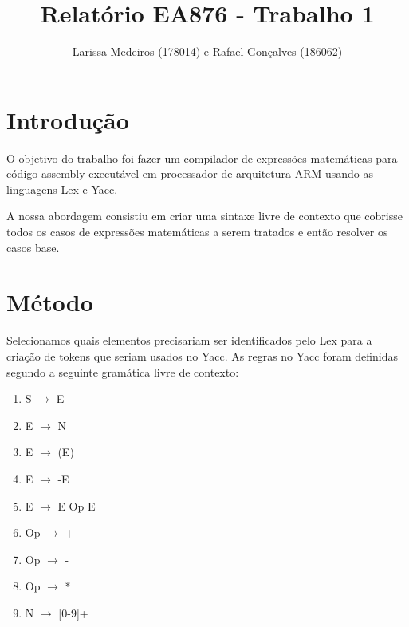 \documentclass[a4paper, 10pt]{article}
\title{Relatório EA876 - Trabalho 1}
\author{Larissa Medeiros (178014) e Rafael Gonçalves (186062)}
\date{}
\begin{document}
\maketitle
\begin{multicols*}{2}

\section*{Introdução}

    O objetivo do trabalho foi fazer um compilador de expressões matemáticas para código assembly executável em processador de arquitetura ARM usando as linguagens Lex e Yacc.

A nossa abordagem consistiu em criar uma sintaxe livre de contexto que cobrisse todos os casos de expressões matemáticas a serem tratados e então resolver os casos base.

\section*{Método}

Selecionamos quais elementos precisariam ser identificados pelo Lex para a criação de tokens que seriam usados no Yacc. As regras no Yacc foram definidas segundo a seguinte gramática livre de contexto:

\begin{multicols*}{2}
\setlength{\columnsep}{0em}
\begin{enumerate}
\item
S $\rightarrow$ E

\item
E $\rightarrow$ N

\item
E $\rightarrow$ (E)

\item
E $\rightarrow$ -E

\item
E $\rightarrow$ E Op E

\item
Op $\rightarrow$ +

\item
Op $\rightarrow$ -

\item
Op $\rightarrow$ *

\item
N $\rightarrow$ [0-9]+

\end{enumerate}

\end{multicols*}


\end{multicols*}
\end{document}
